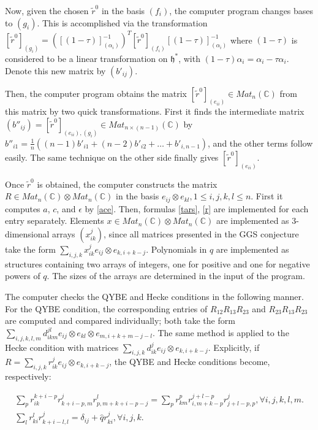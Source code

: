 \documentclass[12pt]{article}
\numberwithin{equation}{section}
\begin{document}
Now, given the chosen $\tilde r^0$ in the basis $(f_i)$, the computer
program changes bases to $(g_i)$.  This is accomplished via the
transformation $[\tilde r^0]_{(g_i)} =
([(1-\tau)]_{(\alpha_i)}^{-1})^{T} [\tilde r^0]_{(f_i)}
[(1-\tau)]_{(\alpha_i)}^{-1}$ where $(1-\tau)$ is considered to be a
linear transformation on $\mathfrak h^*$, with $(1-\tau)\alpha_i =
\alpha_i - \tau \alpha_i$. Denote this new matrix by $(b'_{ij})$.

Then, the computer program obtains the matrix $[\tilde r^0]_{(e_{ii})}
\in Mat_n(\mathbb C)$ from this matrix by two quick transformations.
First it finds the intermediate matrix $(b''_{ij}) = [\tilde
r^0]_{(e_{ii}),(g_i)} \in Mat_{n \times (n-1)}(\mathbb C)$ by
$b''_{i1} = \frac{1}{n} ((n-1)b'_{i1} + (n-2)b'_{i2} + \ldots +
b'_{i,n-1})$, and the other terms follow easily.  The same technique
on the other side finally gives $[\tilde r^0]_{(e_{ii})}$.

Once $\tilde r^0$ is obtained, the computer constructs the matrix $R
\in Mat_n(\mathbb C) \otimes Mat_n(\mathbb C)$ in the basis $e_{ij}
\otimes e_{kl}, 1 \leq i,j,k,l \leq n$.  First it computes $a$, $c$,
and $\epsilon$ by \eqref{ace}.  Then, formulas \eqref{tars}, \eqref{r}
are implemented for each entry separately.  Elements $x \in
Mat_n(\mathbb C) \otimes Mat_n(\mathbb C)$ are implemented as
3-dimensional arrays $(x_{ik}^j)$, since all matrices presented in the
GGS conjecture take the form $\sum_{i,j,k} x_{ik}^j e_{ij} \otimes
e_{k,i+k-j}$.  Polynomials in $q$ are implemented as structures
containing two arrays of integers, one for positive and one for
negative powers of $q$.  The sizes of the arrays are determined in the
input of the program.

The computer checks the QYBE and Hecke conditions in the following
manner.  For the QYBE condition, the corresponding entries of $R_{12}
R_{13} R_{23}$ and $R_{23} R_{13} R_{23}$ are computed and compared
individually; both take the form
$\sum_{i,j,k,l,m} d_{ikm}^{jl} e_{ij} \otimes e_{kl} \otimes
e_{m,i+k+m-j-l}$.  The same method is applied to the Hecke condition
with matrices $\sum_{i,j,k} d_{ik}^j e_{ij} \otimes
e_{k,i+k-j}$.  Explicitly, if $R = \sum_{i,j,k} r_{ik}^j e_{ij} \otimes
e_{k,i+k-j}$, the QYBE and Hecke conditions become, respectively:

\begin{gather}
\sum_p r_{ik}^{k+i-p} r_{k+i-p,m}^j r_{p,m+k+i-p-j}^l = \sum_p
r_{km}^p r_{i,m+k-p}^{j+l-p} r_{j+l-p,p}^j, \forall i,j,k,l,m. \\
\sum_l r_{ki}^l r_{k+i-l,l}^j = \delta_{ij} + \hat q r_{ki}^j, \forall
i,j,k.
\end{gather}
\end{document}
